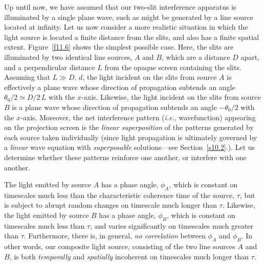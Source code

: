 Up until now, we have assumed that our two-slit interference apparatus is illuminated by a single plane wave, such as
might be generated by a line source located at infinity. Let us now consider a more realistic situation in
which the light source is located  a finite distance from the slits, and also has a finite spatial
extent. Figure~\ref{f11.6} shows the simplest possible case. Here, the slits are
illuminated by two identical line sources, $A$ and $B$, which are a distance $D$ apart, and a
perpendicular distance $L$ from the opaque screen containing the slits. Assuming that $L\gg D,\,d$, the
light incident on the slits from source $A$ is effectively a plane wave whose direction of propagation subtends an angle
$\theta_0/2\simeq D/2\,L$ with the $x$-axis. Likewise, the light incident on the slits from source $B$ is
a plane wave whose direction of propagation subtends an angle $-\theta_0/2$ with the $x$-axis. Moreover, the net interference
pattern ({\em i.e.}, wavefunction) appearing on the projection screen is the {\em linear superposition}\/ of the patterns generated by each
source taken individually (since light propagation is ultimately governed by a {\em linear}\/
wave equation with {\em superposable}\/ solutions---see Section~\ref{s10.2}.).  Let us determine whether these patterns reinforce
one another, or interfere with one another. 

The light emitted by source $A$ has a phase angle, $\phi_A$, which is constant on timescales
much less than the characteristic coherence time of the source, $\tau$, but is subject to
abrupt random changes on timescale much longer than $\tau$. Likewise, the light
emitted by source $B$ has a phase angle, $\phi_B$, which is constant on timescales much
less than $\tau$, and varies significantly on timescales much greater than $\tau$. Furthermore,
there is, in general, {\em no correlation}\/ between  $\phi_A$ and $\phi_B$. In other words, our composite
light source, consisting of the two line sources $A$ and $B$, is both {\em temporally}\/ and {\em spatially}\/
incoherent on timescales much longer than $\tau$. 

